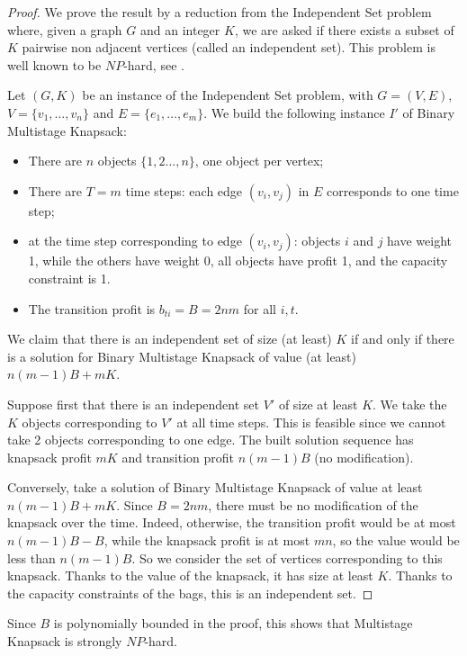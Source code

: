 \documentclass[a4paper]{book}
\newtheorem{proof}{\noindent{\bf Proof.} }
\begin{document}
\begin{proof}


We prove the result by a reduction from the {\sc Independent Set} problem where, given a graph $G$ and an integer $K$, we are asked if there exists a subset of $K$ pairwise non adjacent vertices (called an independent set). This problem is well known to be $NP$-hard, see \cite{gj}.  


Let $(G,K)$ be an instance of the  {\sc Independent Set} problem, with $G=(V,E)$, $V=\{v_1,\dots,v_n\}$ and $E=\{e_1,\dots,e_m\}$. We build the following instance $I'$ of {\sc Binary Multistage  Knapsack}: 
\begin{itemize}
\item There are $n$ objects $\{1,2\dots,n\}$, one object per vertex;
\item There are $T=m$ time steps: each edge $(v_i,v_j)$ in $E$ corresponds to one time step;
\item at the time step corresponding to edge $(v_i,v_j)$: objects $i$ and $j$ have weight 1, while the others have weight 0, all objects have profit 1, and the capacity constraint is 1.
\item The transition profit is $b_{ti}=B=2nm$ for all $i,t$.
\end{itemize}

We claim that there is an independent set of size (at least) $K$ if and only if there is a solution for {\sc Binary Multistage  Knapsack} of value (at least) $n(m-1)B+mK$. 

Suppose first that there is an independent set $V'$ of size at least $K$. We take the $K$ objects corresponding to $V'$ at all time steps. This is feasible since we cannot take 2 objects corresponding to one edge. The built solution sequence has knapsack profit $mK$ and transition profit $n(m-1)B$ (no modification). 

Conversely, take a solution of {\sc Binary Multistage  Knapsack} of value at least $n(m-1)B+mK$. Since $B=2nm$, there must be no modification of the knapsack over the time. Indeed, otherwise, the transition profit would be at most $n(m-1)B-B$, while the knapsack profit is at most $mn$, so the value would be less than $n(m-1)B$. So we consider the set of vertices corresponding to this knapsack. Thanks to the value of the knapsack, it has size at least $K$. Thanks to the capacity constraints of the bags, this is an independent set. 
\end{proof}
Since $B$ is polynomially bounded in the proof, this shows that {\sc Multistage  Knapsack} is strongly $NP$-hard.
\end{document}
